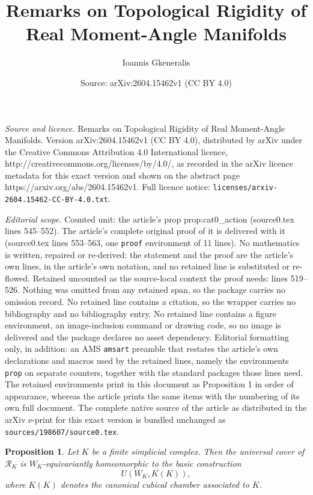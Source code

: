 \documentclass[10pt,a4paper]{amsart}
\title{Remarks on Topological Rigidity of Real Moment-Angle Manifolds}
\author{Ioannis Gkeneralis}
\date{Source: arXiv:2604.15462v1 (CC BY 4.0)}
\newtheorem{prop}{Proposition}
\begin{document}
\maketitle

\noindent\emph{Source and licence.} Remarks on Topological Rigidity of Real Moment-Angle Manifolds. Version arXiv:2604.15462v1 (CC BY 4.0), distributed by arXiv under the Creative Commons Attribution 4.0 International licence, http://creativecommons.org/licenses/by/4.0/, as recorded in the arXiv licence metadata for this exact version and shown on the abstract page https://arxiv.org/abs/2604.15462v1. Full licence notice: \texttt{licenses/arxiv-2604.15462-CC-BY-4.0.txt}.\par\smallskip

\noindent\textit{Editorial scope.} Counted unit: the article's prop prop:cat0\_action (source0.tex lines 545--552). The article's complete original proof of it is delivered with it (source0.tex lines 553--563, one \texttt{proof} environment of 11 lines). No mathematics is written, repaired or re-derived: the statement and the proof are the article's own lines, in the article's own notation, and no retained line is substituted or re-flowed.  Retained uncounted as the source-local context the proof needs: lines 519--526.  Nothing was omitted from any retained span, so the package carries no omission record.  No retained line contains a citation, so the wrapper carries no bibliography and no bibliography entry.  No retained line contains a figure environment, an image-inclusion command or drawing code, so no image is delivered and the package declares no asset dependency.  Editorial formatting only, in addition: an AMS \texttt{amsart} preamble that restates the article's own declarations and macros used by the retained lines, namely the environments \texttt{prop} on separate counters, together with the standard packages those lines need.  The retained environments print in this document as Proposition 1 in order of appearance, whereas the article prints the same items with the numbering of its own full document.  The complete native source of the article as distributed in the arXiv e-print for this exact version is bundled unchanged as \texttt{sources/198607/source0.tex}.
\begin{prop}
\label{prop:universal-cover-davis}
Let $K$ be a finite simplicial complex. Then the universal cover of $\mathcal{R}_K$ is $W_K$-equivariantly homeomorphic to the basic construction
\[
U(W_K,K(K)),
\]
where $K(K)$ denotes the canonical cubical chamber associated to $K$.
\end{prop}
\end{document}
